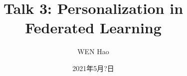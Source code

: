 

\title{Talk 3: Personalization in Federated Learning}
\date{2021年5月?日}
\author{WEN Hao}

\maketitle






